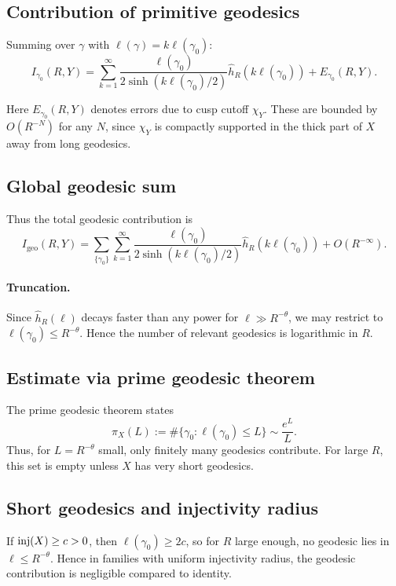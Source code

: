 \subsection{Contribution of primitive geodesics}\label{subsec:geom-primitive}

Summing over $\gamma$ with $\ell(\gamma)=k\ell(\gamma_0)$:
\[
I_{\gamma_0}(R,Y) = \sum_{k=1}^\infty \frac{\ell(\gamma_0)}{2\sinh(k\ell(\gamma_0)/2)} \widehat{h}_R(k\ell(\gamma_0)) + E_{\gamma_0}(R,Y).
\]

Here $E_{\gamma_0}(R,Y)$ denotes errors due to cusp cutoff $\chi_Y$. These are bounded by $O(R^{-N})$ for any $N$, since $\chi_Y$ is compactly supported in the thick part of $X$ away from long geodesics.

\subsection{Global geodesic sum}\label{subsec:geom-sum}

Thus the total geodesic contribution is
\[
I_{\mathrm{geo}}(R,Y) = \sum_{\{\gamma_0\}} \sum_{k=1}^\infty \frac{\ell(\gamma_0)}{2\sinh(k\ell(\gamma_0)/2)} \widehat{h}_R(k\ell(\gamma_0)) + O(R^{-\infty}).
\]

\paragraph{Truncation.} Since $\widehat{h}_R(\ell)$ decays faster than any power for $\ell\gg R^{-\theta}$, we may restrict to $\ell(\gamma_0)\le R^{-\theta}$. Hence the number of relevant geodesics is logarithmic in $R$.

\subsection{Estimate via prime geodesic theorem}\label{subsec:geom-prime}

The prime geodesic theorem states
\[
\pi_X(L):=\#\{\gamma_0:\ell(\gamma_0)\le L\}\sim \frac{e^L}{L}.
\]
Thus, for $L=R^{-\theta}$ small, only finitely many geodesics contribute. For large $R$, this set is empty unless $X$ has very short geodesics.

\subsection{Short geodesics and injectivity radius}\label{subsec:geom-short}

If $\mathrm{inj}(X)\ge c>0$, then $\ell(\gamma_0)\ge 2c$, so for $R$ large enough, no geodesic lies in $\ell\le R^{-\theta}$. Hence in families with uniform injectivity radius, the geodesic contribution is negligible compared to identity.

